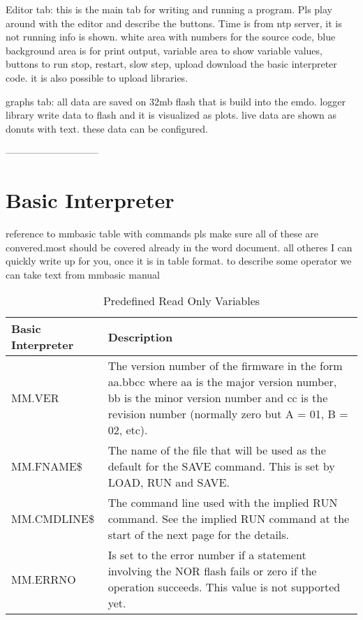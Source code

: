 \documentclass[11pt,fleqn]{book} %
\numberwithin{equation}{section} %
\numberwithin{figure}{section} %
\numberwithin{table}{section} %
\begin{document}
Editor tab: this is the main tab for writing and running a program.  Pls play around with the editor and  describe the buttons. Time is from ntp server, it is not running info is shown. white area with numbers for the source code, blue background area is for print output, variable area to show variable values, buttons to run stop, restart, slow step, upload download the basic interpreter code. it is also possible to upload libraries.

graphs tab: all data are saved on 32mb flash that is build into the emdo. logger library write data to flash and it is visualized as plots. live data are shown as donuts with text. these data can be configured.

-----------------------------

\chapter{Basic Interpreter}

reference to mmbasic
table with commands
pls make sure all of these are convered.most should be covered already in the word document. all otheres I can quickly write up for you, once it is in table format. to describe some operator we can take text from mmbasic manual

\begin{table}[]
\centering
\caption{Predefined Read Only Variables}
\label{Predefined_Read_Only_Variables}
\begin{tabular}{|p{4cm}|p{10cm}|}
\hline
\textbf{Basic Interpreter} & \textbf{Description}                                                             \\ \hline
MM.VER & The version number of the firmware in the form aa.bbcc where aa is the major version number, bb is the minor version number and cc is the revision number (normally zero but A = 01, B = 02, etc).
\\ \hline
MM.FNAME\$ & The name of the file that will be used as the default for the SAVE command. This is set by LOAD, RUN and SAVE.
\\ \hline
MM.CMDLINE\$ & The command line used with the implied RUN command. See the implied RUN command at the start of the next page for the details.
\\ \hline
MM.ERRNO & Is set to the error number if a statement involving the NOR flash fails or
zero if the operation succeeds. This value is not supported yet.
\\ \hline
\end{tabular}
\end{table}
\end{document}
